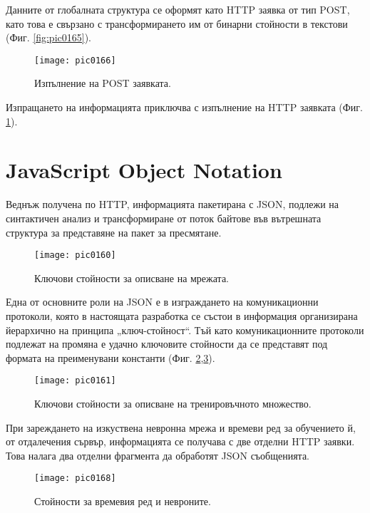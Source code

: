 Данните от глобалната структура се оформят като HTTP заявка от тип POST, като това е свързано с трансформирането им от бинарни стойности в текстови (Фиг. \ref{fig:pic0165}).

\begin{figure}[h]
  \centering
  \texttt{[image: pic0166]}
  \caption{Изпълнение на POST заявката.}
\label{fig:pic0166}
\end{figure}
\FloatBarrier

Изпращането на информацията приключва с изпълнение на HTTP заявката (Фиг. \ref{fig:pic0166}).

\section{JavaScript Object Notation}

Веднъж получена по HTTP, информацията пакетирана с JSON, подлежи на синтактичен анализ и трансформиране от поток байтове във вътрешната структура за представяне на пакет за пресмятане. 

\begin{figure}[h]
  \centering
  \texttt{[image: pic0160]}
  \caption{Ключови стойности за описване на мрежата.}
\label{fig:pic0160}
\end{figure}
\FloatBarrier

Една от основните роли на JSON е в изграждането на комуникационни протоколи, която в настоящата разработка се състои в информация организирана йерархично на принципа „ключ-стойност“. Тъй като комуникационните протоколи подлежат на промяна е удачно ключовите стойности да се представят под формата на преименувани константи (Фиг. \ref{fig:pic0160},\ref{fig:pic0161}).

\begin{figure}[h]
  \centering
  \texttt{[image: pic0161]}
  \caption{Ключови стойности за описване на тренировъчното множество.}
\label{fig:pic0161}
\end{figure}
\FloatBarrier

При зареждането на изкуствена невронна мрежа и времеви ред за обучението й, от отдалечения сървър, информацията се получава с две отделни HTTP заявки. Това налага два отделни фрагмента да обработят JSON съобщенията. 

\begin{figure}[h]
  \centering
  \texttt{[image: pic0168]}
  \caption{Стойности за времевия ред и невроните.}
\label{fig:pic0168}
\end{figure}
\FloatBarrier

